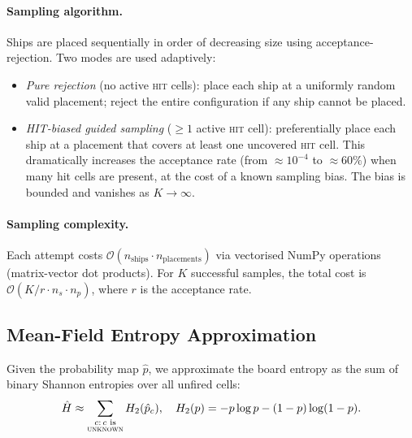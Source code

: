 \documentclass[12pt,a4paper]{article}
\newcommand{\1}{\mathbf{1}}
\newcommand{\Hb}{H_2}
\newcommand{\bigo}{\mathcal{O}}
\begin{document}
\paragraph{Sampling algorithm.}
Ships are placed sequentially in order of decreasing size using
acceptance-rejection.  Two modes are used adaptively:
\begin{itemize}[nosep]
  \item \emph{Pure rejection} (no active \textsc{hit} cells): place each ship at
        a uniformly random valid placement; reject the entire configuration if any
        ship cannot be placed.
  \item \emph{HIT-biased guided sampling} ($\geq 1$ active \textsc{hit} cell):
        preferentially place each ship at a placement that covers at least one
        uncovered \textsc{hit} cell.  This dramatically increases the acceptance
        rate (from $\approx 10^{-4}$ to $\approx 60\%$) when many hit cells are
        present, at the cost of a known sampling bias.  The bias is bounded and
        vanishes as $K\to\infty$.
\end{itemize}

\paragraph{Sampling complexity.}
Each attempt costs $\bigo(n_{\text{ships}} \cdot n_{\text{placements}})$ via
vectorised NumPy operations (matrix-vector dot products).  For $K$ successful
samples, the total cost is $\bigo(K / r \cdot n_s \cdot n_p)$, where $r$ is the
acceptance rate.

\subsection{Mean-Field Entropy Approximation}
\label{sec:mf_entropy}

Given the probability map $\hat{p}$, we approximate the board entropy as the
sum of binary Shannon entropies over all unfired cells:
\begin{equation}
  \hat{H} \approx \sum_{\substack{c:\,c\text{ is}\\\textsc{unknown}}}
    \Hb(\hat{p}_c),
  \quad \Hb(p) = -p\log p - (1-p)\log(1-p).
  \label{eq:mf_entropy}
\end{equation}
\end{document}
